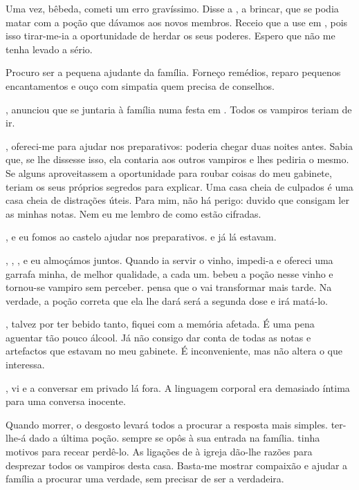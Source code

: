 {Uma vez, bêbeda, cometi um erro gravíssimo. Disse a , a brincar, que se podia matar com a poção que dávamos aos novos membros. Receio que a use em , pois isso tirar-me-ia a oportunidade de herdar os seus poderes. Espero que não me tenha levado a sério.

Procuro ser a pequena ajudante da família. Forneço remédios, reparo pequenos encantamentos e ouço com simpatia quem precisa de conselhos.

,  anunciou que  se juntaria à família numa festa em . Todos os vampiros teriam de ir.

, ofereci-me para ajudar  nos preparativos: poderia chegar duas noites antes. Sabia que, se lhe dissesse isso, ela contaria aos outros vampiros e lhes pediria o mesmo. Se alguns aproveitassem a oportunidade para roubar coisas do meu gabinete, teriam os seus próprios segredos para explicar. Uma casa cheia de culpados é uma casa cheia de distrações úteis. Para mim, não há perigo: duvido que consigam ler as minhas notas. Nem eu me lembro de como estão cifradas.

,  e eu fomos ao castelo ajudar nos preparativos.  e  já lá estavam.

, , ,  e eu almoçámos juntos. Quando  ia servir o vinho, impedi-a e ofereci uma garrafa minha, de melhor qualidade, a cada um.  bebeu a poção nesse vinho e tornou-se vampiro sem perceber.  pensa que o vai transformar mais tarde. Na verdade, a poção correta que ela lhe dará será a segunda dose e irá matá-lo.

, talvez por ter bebido tanto, fiquei com a memória afetada. É uma pena aguentar tão pouco álcool. Já não consigo dar conta de todas as notas e artefactos que estavam no meu gabinete. É inconveniente, mas não altera o que interessa.

, vi  e  a conversar em privado lá fora. A linguagem corporal era demasiado íntima para uma conversa inocente.

Quando  morrer, o desgosto levará todos a procurar a resposta mais simples.  ter-lhe-á dado a última poção.  sempre se opôs à sua entrada na família.  tinha motivos para recear perdê-lo. As ligações de  à igreja dão-lhe razões para desprezar todos os vampiros desta casa. Basta-me mostrar compaixão e ajudar a família a procurar uma verdade, sem precisar de ser a verdadeira.

}
